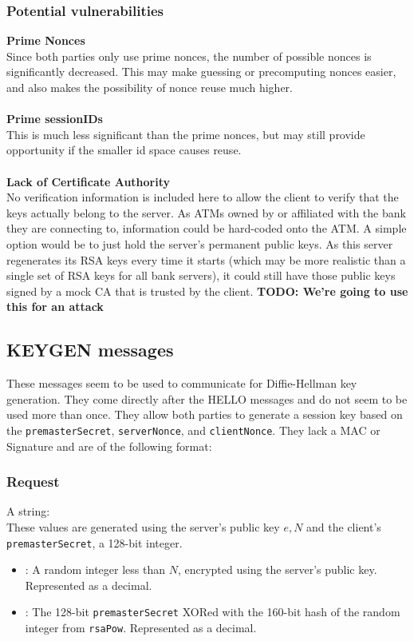 \documentclass{article}
\newcommand{\code}[1]{\tcbox[
    on line,
    colback=codebackground, boxsep=2pt,
    colframe=white, boxrule=0pt,
    top=0pt, bottom=0pt, left=0pt, right=0pt
]{\texttt{#1}}}
\begin{document}
\subsubsection{Potential vulnerabilities}
\textbf{Prime Nonces} \\
Since both parties only use prime nonces, the number of possible nonces is significantly decreased. This may make guessing or precomputing nonces easier, and also makes the possibility of nonce reuse much higher. \\
\\
\textbf{Prime sessionIDs} \\
This is much less significant than the prime nonces, but may still provide opportunity if the smaller id space causes reuse. \\
\\
\textbf{Lack of Certificate Authority} \\
No verification information is included here to allow the client to verify that the keys actually belong to the server. As ATMs owned by or affiliated with the bank they are connecting to, information could be hard-coded onto the ATM. A simple option would be to just hold the server's permanent public keys. As this server regenerates its RSA keys every time it starts (which may be more realistic than a single set of RSA keys for all bank servers), it could still have those public keys signed by a mock CA that is trusted by the client. \textbf{TODO: We're going to use this for an attack}

\subsection{KEYGEN messages}
These messages seem to be used to communicate for Diffie-Hellman key generation. They come directly after the HELLO messages and do not seem to be used more than once. They allow both parties to generate a session key based on the \texttt{premasterSecret}, \texttt{serverNonce}, and \texttt{clientNonce}.
They lack a MAC or Signature and are of the following format:

\subsubsection{Request}
A string: \code{\textit{rsaPow}|\textit{rsaCipher}} \\
These values are generated using the server's public key $e,N$ and the client's \texttt{premasterSecret}, a 128-bit integer.
\begin{itemize}
    \item \code{rsaPow}: A random integer less than $N$, encrypted using the server's public key. Represented as a decimal.
    \item \code{rsaCipher}: The 128-bit \texttt{premasterSecret} XORed with the 160-bit hash of the random integer from \texttt{rsaPow}. Represented as a decimal.
\end{itemize}
\end{document}
